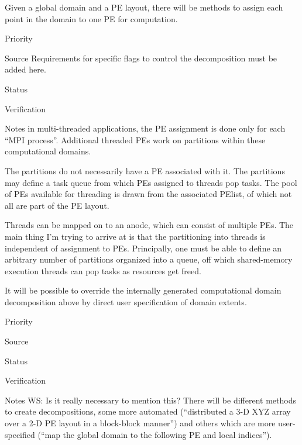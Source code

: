 
Given a global domain and a PE layout, there will be methods to assign
each point in the domain to one PE for computation. 

\begin{reqlist}
\item[Priority]
\item[Source] Requirements for specific flags to control the
  decomposition must be added here.
\item[Status]
\item[Verification]
\item[Notes] in multi-threaded applications, the PE assignment is done
  only for each ``MPI process''. Additional threaded PEs work on
  partitions within these computational domains.
  
  The partitions do not necessarily have a PE associated with it. The
  partitions may define a task queue from which PEs assigned to
  threads pop tasks. The pool of PEs available for threading is drawn
  from the associated PElist, of which not all are part of the PE
  layout.
  
  Threads can be mapped on to an anode, which can consist of multiple
  PEs.  The main thing I'm trying to arrive at is that the
  partitioning into threads is independent of assignment to PEs.
  Principally, one must be able to define an arbitrary number of
  partitions organized into a queue, off which shared-memory execution
  threads can pop tasks as resources get freed.
\end{reqlist}


It will be possible to override the internally generated computational
domain decomposition above by direct user specification of domain
extents.

\begin{reqlist}
\item[Priority]
\item[Source]
\item[Status]
\item[Verification]
\item[Notes]  WS: Is it really necessary to mention this? There will
be different methods to create decompositions, some more automated
(``distributed a 3-D XYZ array over a 2-D PE layout in a block-block
manner'') and others which are more user-specified (``map the global domain
to the following PE and local indices'').

\end{reqlist}

